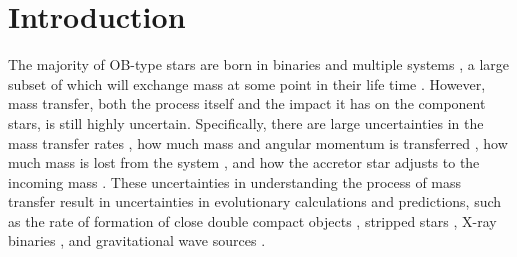 \documentclass[twocolumn, twocolappendix, oneside]{aastex631}
\begin{document}

{\hypersetup{linkcolor=black}\listoftodos}

\section{Introduction} \label{sec:intro}

The majority of OB-type stars are born in binaries and multiple systems \citep[e.g.][]{Mason+2009, Almeida+2017, Moe+2017}, a large subset of which will exchange mass at some point in their life time \citep[e.g][]{Sana+2012,deMink+2014}. However, mass transfer, both the process itself and the impact it has on the component stars, is still highly uncertain. Specifically, there are large uncertainties in the mass transfer rates \citep{Dray+2007}, how much mass and angular momentum is transferred \citep{Packet+1981,deMink+2007:2007A&A...467.1181D,Renzo+2021}, how much mass is lost from the system \citep{Tout2012}, and how the accretor star adjusts to the incoming mass \citep{Hellings1983,Braun+1995,Cantiello+2007,Staritsin+2019,Renzo+2023}. These uncertainties in understanding the process of mass transfer result in uncertainties in evolutionary calculations and predictions, such as the rate of formation of close double compact objects \citep{Toonen+2013,Marchant2021+, vanSon+2022:2022ApJ...940..184V}, stripped stars \citep{Crowther2007,Heber2016,Gotberg+2020}, X-ray binaries \citep{Fragos+2013:2013ApJ...764...41F}, and gravitational wave sources \citep[e.g.][]{Broekgaarden+2022,Iorio+2023}.


\end{document}

